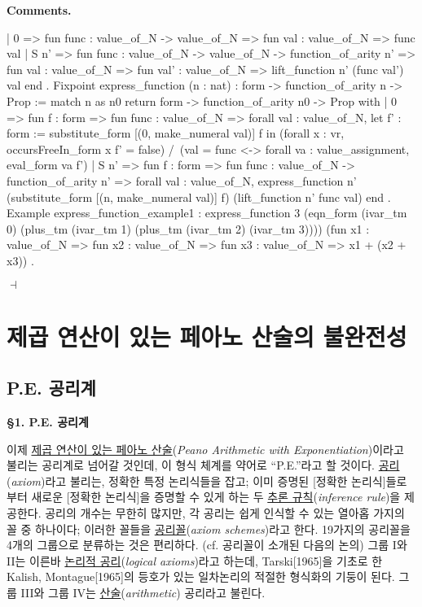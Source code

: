 \documentclass[12pt]{paper}
\newenvironment{context}[1][]
{ \noindent \textbf{{#1}.}
}
{ \hfill $ \dashv $
}
\begin{document}
\begin{context}[Comments]
\begin{coqcode}
  | 0 =>
    fun func : value_of_N -> value_of_N =>
    fun val : value_of_N =>
    func val
  | S n' =>
    fun func : value_of_N -> value_of_N -> function_of_arity n' =>
    fun val : value_of_N =>
    fun val' : value_of_N =>
    lift_function n' (func val') val 
  end
.
Fixpoint express_function (n : nat) : form -> function_of_arity n -> Prop :=
  match n as n0 return form -> function_of_arity n0 -> Prop with
  | 0 =>
    fun f : form =>
    fun func : value_of_N =>
    forall val : value_of_N,
    let f' : form := substitute_form [(0, make_numeral val)] f in
    (forall x : vr, occursFreeIn_form x f' = false) /\ (val = func <-> forall va : value_assignment, eval_form va f')
  | S n' =>
    fun f : form =>
    fun func : value_of_N -> function_of_arity n' =>
    forall val : value_of_N, express_function n' (substitute_form [(n, make_numeral val)] f) (lift_function n' func val)
  end
.
Example express_function_example1 :
  express_function 3 (eqn_form (ivar_tm 0) (plus_tm (ivar_tm 1) (plus_tm (ivar_tm 2) (ivar_tm 3)))) (fun x1 : value_of_N => fun x2 : value_of_N => fun x3 : value_of_N => x1 + (x2 + x3))
.
    \end{coqcode}
  \end{context}

  \section{제곱 연산이 있는 페아노 산술의 불완전성}

  \subsection{P.E. 공리계}

  \textbf{\S1. P.E. 공리계}

  이제 \underline{제곱 연산이 있는 페아노 산술}(\textit{Peano Arithmetic with Exponentiation})이라고 불리는 공리계로 넘어갈 것인데,
  이 형식 체계를 약어로 ``P.E.''라고 할 것이다.
  \underline{공리}(\textit{axiom})라고 불리는, 정확한 특정 논리식들을 잡고;
  이미 증명된 [정확한 논리식]들로부터 새로운 [정확한 논리식]을 증명할 수 있게 하는 두 \underline{추론 규칙}(\textit{inference rule})을 제공한다.
  공리의 개수는 무한히 많지만,
  각 공리는 쉽게 인식할 수 있는 열아홉 가지의 꼴 중 하나이다;
  이러한 꼴들을 \underline{공리꼴}(\textit{axiom schemes})라고 한다.
  19가지의 공리꼴을 4개의 그룹으로 분류하는 것은 편리하다. (cf. 공리꼴이 소개된 다음의 논의)
  그룹 I와 II는 이른바 \underline{논리적 공리}(\textit{logical axioms})라고 하는데,
  Tarski[1965]을 기초로 한 Kalish, Montague[1965]의 등호가 있는 일차논리의 적절한 형식화의 기둥이 된다.
  그룹 III와 그룹 IV는 \underline{산술}(\textit{arithmetic}) 공리라고 불린다.
\end{document}
